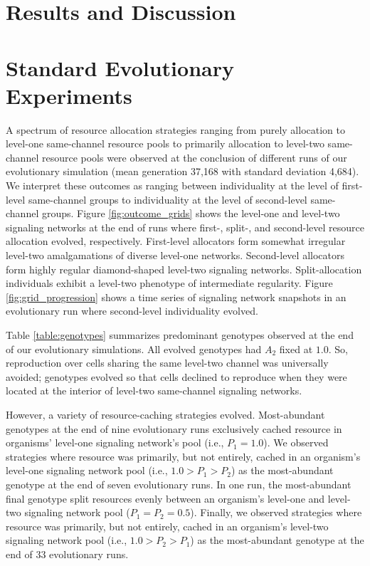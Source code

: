 \section{Results and Discussion}

\section{Standard Evolutionary Experiments}







A spectrum of resource allocation strategies ranging from purely allocation to level-one same-channel resource pools to primarily allocation to level-two same-channel resource pools were observed at the conclusion of different runs of our evolutionary simulation (mean generation 37,168 with standard deviation 4,684).
We interpret these outcomes as ranging between individuality at the level of first-level same-channel groups to individuality at the level of second-level same-channel groups.
Figure \ref{fig:outcome_grids} shows the level-one and level-two signaling networks at the end of runs where first-, split-, and second-level resource allocation evolved, respectively.
First-level allocators form somewhat irregular level-two amalgamations of diverse level-one networks.
Second-level allocators form highly regular diamond-shaped level-two signaling networks.
Split-allocation individuals exhibit a level-two phenotype of intermediate regularity.
Figure \ref{fig:grid_progression} shows a time series of signaling network snapshots in an evolutionary run where second-level individuality evolved.

Table \ref{table:genotypes} summarizes predominant genotypes observed at the end of our evolutionary simulations.
All evolved genotypes had $A_2$ fixed at $1.0$.
So, reproduction over cells sharing the same level-two channel was universally avoided;
genotypes evolved so that cells declined to reproduce when they were located at the interior of level-two same-channel signaling networks.

However, a variety of resource-caching strategies evolved.
Most-abundant genotypes at the end of nine evolutionary runs exclusively cached resource in organisms' level-one signaling network's pool (i.e., $P_1 = 1.0$).
We observed strategies where resource was primarily, but not entirely, cached in an organism's level-one signaling network pool (i.e., $1.0 > P_1 > P_2$) as the most-abundant genotype at the end of seven evolutionary runs.
In one run, the most-abundant final genotype split resources evenly between an organism's level-one and level-two signaling network pool ($P_1 = P_2 = 0.5$).
Finally, we observed strategies where resource was primarily, but not entirely, cached in an organism's level-two signaling network pool (i.e., $1.0 > P_2 > P_1$) as the most-abundant genotype at the end of 33 evolutionary runs.


